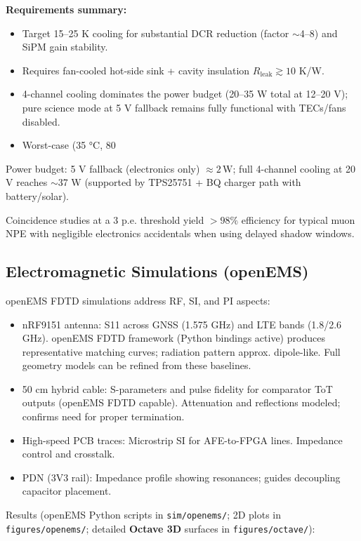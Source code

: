 \documentclass[11pt,a4paper]{article}
\begin{document}
\textbf{Requirements summary:}
\begin{itemize}
  \item Target 15--25 K cooling for substantial DCR reduction (factor $\sim$4--8) and SiPM gain stability.
  \item Requires fan-cooled hot-side sink + cavity insulation $R_\text{leak} \gtrsim 10$ K/W.
  \item 4-channel cooling dominates the power budget (20--35 W total at 12--20 V); pure science mode at 5 V fallback remains fully functional with TECs/fans disabled.
  \item Worst-case (35 °C, 80 %
\end{itemize}

Power budget: 5 V fallback (electronics only) $\approx 2\,\mathrm{W}$; full 4-channel cooling at 20 V reaches $\sim$37 W (supported by TPS25751 + BQ charger path with battery/solar).

Coincidence studies at a 3 p.e. threshold yield $>98\%$ efficiency for typical muon NPE with negligible electronics accidentals when using delayed shadow windows.

\subsection{Electromagnetic Simulations (openEMS)}

openEMS FDTD simulations address RF, SI, and PI aspects:

\begin{itemize}
  \item nRF9151 antenna: S11 across GNSS (1.575 GHz) and LTE bands (1.8/2.6 GHz). openEMS FDTD framework (Python bindings active) produces representative matching curves; radiation pattern approx. dipole-like. Full geometry models can be refined from these baselines.
  \item 50 cm hybrid cable: S-parameters and pulse fidelity for comparator ToT outputs (openEMS FDTD capable). Attenuation and reflections modeled; confirms need for proper termination.
  \item High-speed PCB traces: Microstrip SI for AFE-to-FPGA lines. Impedance control and crosstalk.
  \item PDN (3V3 rail): Impedance profile showing resonances; guides decoupling capacitor placement.
\end{itemize}

Results (openEMS Python scripts in \texttt{sim/openems/}; 2D plots in \texttt{figures/openems/}; detailed \textbf{Octave 3D} surfaces in \texttt{figures/octave/}):
\end{document}
